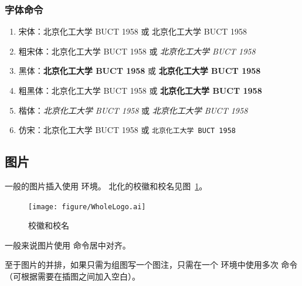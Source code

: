 \subsubsection{字体命令}
\begin{enumerate}
	\item 宋体：北京化工大学 BUCT 1958 或 \textrm{北京化工大学 BUCT 1958}
	\item 粗宋体：{\bfsong 北京化工大学 BUCT 1958} 或 \emph{北京化工大学 BUCT 1958}
	\item 黑体：{\bfseries 北京化工大学 BUCT 1958} 或 \textbf{北京化工大学 BUCT 1958}
	\item 粗黑体：{\bfhei 北京化工大学 BUCT 1958} 或 \textbf{\heiti 北京化工大学 BUCT 1958}
	\item 楷体：{\itshape 北京化工大学 BUCT 1958} 或 \textit{北京化工大学 BUCT 1958}
	\item 仿宋：{\ttfamily 北京化工大学 BUCT 1958} 或 \texttt{北京化工大学 BUCT 1958}
\end{enumerate}
\subsection{图片}\label{subsec:fig}
一般的图片插入使用  环境。
北化的校徽和校名见图~\ref{fig:WholeLogo}。

\begin{figure}[H]
	\centering
	\texttt{[image: figure/WholeLogo.ai]}
	\caption{校徽和校名}\label{fig:WholeLogo}
\end{figure}

一般来说图片使用 命令居中对齐。

至于图片的并排，如果只需为组图写一个图注，只需在一个  环境中使用多次  命令（可根据需要在插图之间加入空白）。

